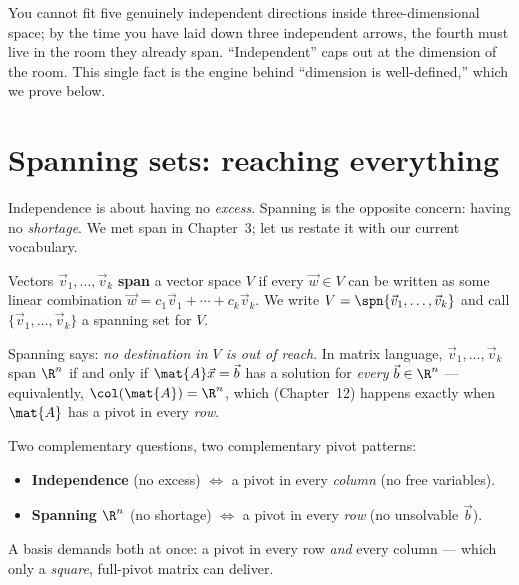 \begin{intuitionbox}
You cannot fit five genuinely independent directions inside three-dimensional
space; by the time you have laid down three independent arrows, the fourth must
live in the room they already span. ``Independent'' caps out at the dimension of
the room. This single fact is the engine behind ``dimension is well-defined,''
which we prove below.
\end{intuitionbox}

\section{Spanning sets: reaching everything}
\label{ch14:span}

Independence is about having no \emph{excess}. Spanning is the opposite concern:
having no \emph{shortage}. We met span in Chapter~3; let us restate it with our
current vocabulary.

\begin{definition}
\label{ch14:def-span}
Vectors $\vec{v}_1,\dots,\vec{v}_k$ \textbf{span} a vector space $V$ if every
$\vec{w}\in V$ can be written as some linear combination
$\vec{w} = c_1\vec{v}_1 + \cdots + c_k\vec{v}_k$. We write $V = \spn\{\vec{v}_1,
\dots,\vec{v}_k\}$ and call $\{\vec{v}_1,\dots,\vec{v}_k\}$ a spanning set for $V$.
\end{definition}

Spanning says: \emph{no destination in $V$ is out of reach}. In matrix language,
$\vec{v}_1,\dots,\vec{v}_k$ span $\R^n$ if and only if $\mat{A}\vec{x}=\vec{b}$
has a solution for \emph{every} $\vec{b}\in\R^n$ --- equivalently, $\col(\mat{A})
= \R^n$, which (Chapter~12) happens exactly when $\mat{A}$ has a pivot in every
\emph{row}.

\begin{focusbox}
Two complementary questions, two complementary pivot patterns:
\begin{itemize}
  \item \textbf{Independence} (no excess) $\iff$ a pivot in every \emph{column}
        (no free variables).
  \item \textbf{Spanning} $\R^n$ (no shortage) $\iff$ a pivot in every
        \emph{row} (no unsolvable $\vec{b}$).
\end{itemize}
A basis demands both at once: a pivot in every row \emph{and} every column ---
which only a \emph{square}, full-pivot matrix can deliver.
\end{focusbox}

